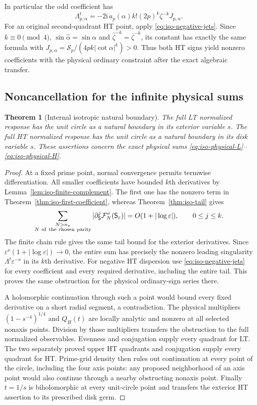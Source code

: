 \documentclass[11pt]{article}
\numberwithin{equation}{section}
\newtheorem{theorem}{Theorem}[section]
\theoremstyle{definition}
\newcommand{\ii}{\mathrm i}
\newcommand{\eps}{\varepsilon}
\begin{document}
In particular the odd coefficient has
\[
 \Lambda^t_{p,\alpha}
   =-2\ii\,a_p(\alpha)k!(2p)^k\zeta^{-k}J_{p,\alpha}.
\]
For an original second-quadrant HT point, apply
\eqref{eq:iso-negative-jets}.  Since $k\equiv0\pmod4$,
$\sin\widehat\alpha=\sin\alpha$ and
$\widehat\zeta^{-k}=\overline\zeta^{-k}$, its constant has exactly
the same formula with
$J_{p,\alpha}=\mathcal S_p/(4pk|\cot\alpha|^k)>0$.
Thus both HT signs yield nonzero coefficients with the physical
ordinary constraint after the exact algebraic transfer.

\subsection{Noncancellation for the infinite physical sums}

\begin{theorem}[Internal isotropic natural boundary]
\label{thm:iso-internal-boundary}
The full LT normalized response has the unit circle as a natural
boundary in its exterior variable $s$.  The full HT normalized
response has the unit circle as a natural boundary in its disk
variable $s$.  These assertions concern the exact physical sums
\eqref{eq:iso-physical-L}--\eqref{eq:iso-physical-H}.
\end{theorem}
\begin{proof}
At a fixed prime point, normal convergence permits termwise
differentiation.  All smaller coefficients have bounded $k$th
derivatives by Lemma~\ref{lem:iso-finite-complement}.
The first one has the nonzero term in
Theorem~\ref{thm:iso-first-coefficient}, whereas
Theorem~\ref{thm:iso-tail} gives
\[
 \sum_{\substack{N>n_*\\N\ {\rm of\ the\ chosen\ parity}}}
       |\partial_{\mathsf S}^{j}\mathcal F_N^\sigma(\mathsf S_\eps)|
     =O(1+|\log\eps|),\qquad 0\le j\le k.
\]
The finite chain rule gives the same tail bound for the exterior
derivatives.  Since $\eps^\nu(1+|\log\eps|)\to0$, the entire
sum has precisely the nonzero leading singularity
$\Lambda^t\eps^{-\nu}$ in its $k$th derivative.
For negative HT dispersion use \eqref{eq:iso-negative-jets} for
every coefficient and every required derivative, including the
entire tail.  This proves the same obstruction for the physical
ordinary-sign series there.

A holomorphic continuation through such a point would bound every
fixed derivative on a short radial segment, a contradiction.
The physical multipliers $(1-s^{-4})^{1/4}$ and $Q_H(t)$ are
locally analytic and nonzero at all selected nonaxis points.
Division by those multipliers transfers the obstruction to the full
normalized observables.  Evenness and conjugation supply every
quadrant for LT.  The two separately proved upper HT quadrants
and conjugation supply every quadrant for HT.  Prime-grid density
then rules out continuation at every point of the circle, including
the four axis points: any proposed neighborhood of an axis point
would also continue through a nearby obstructing nonaxis point.
Finally $t=1/s$ is biholomorphic at every unit-circle point and
transfers the exterior HT assertion to its prescribed disk germ.
\end{proof}
\end{document}
